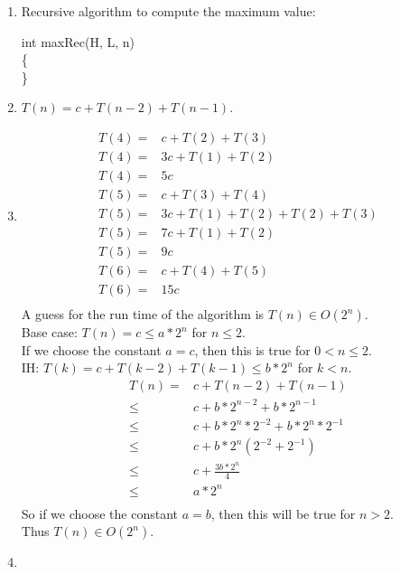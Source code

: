 \documentclass{assignment}
\begin{document}
\begin{problemlist}
\begin{answer}
\begin{enumerate}
\item
Recursive algorithm to compute the maximum value:\\
\IncMargin{3em}
\begin{algorithm}
  int maxRec(H, L, n)\\\{\\
  \Indp
  \;
  \Indm
  \}
\end{algorithm}
\DecMargin{3em}
\item
$T(n) = c + T(n-2) + T(n-1)$.\\
\clearpage
\item
\begin{align*}
T(4) = &c + T(2) + T(3)\\
T(4) = &3c + T(1) + T(2)\\
T(4) = &5c\\
T(5) = &c + T(3) + T(4)\\
T(5) = &3c + T(1) + T(2) + T(2) + T(3)\\
T(5) = &7c + T(1) + T(2)\\
T(5) = &9c\\
T(6) = &c + T(4) + T(5)\\
T(6) = &15c\\
\end{align*}
A guess for the run time of the algorithm is $T(n) \in O(2^n)$.\\
Base case: $T(n) = c \le a*2^n$ for $n \le 2$.\\
If we choose the constant $a=c$, then this is true for $0<n\le 2$.\\
IH: $T(k) = c + T(k-2) + T(k-1) \le b*2^n$ for $k<n$.\\
\begin{align*}
T(n) = &c + T(n-2) + T(n-1)\\
\le &c + b*2^{n-2} + b*2^{n-1}\\
\le &c + b*2^n*2^{-2} + b*2^n*2^{-1}\\
\le &c + b*2^n(2^{-2} + 2^{-1})\\
\le &c + \frac{3b*2^n}{4}\\
\le &a*2^n\\
\end{align*}
So if we choose the constant $a=b$, then this will be true for $n>2$.\\
Thus $T(n) \in O(2^n)$.\\
\clearpage
\item

\end{enumerate}
\end{answer}
\end{problemlist}
\end{document}
